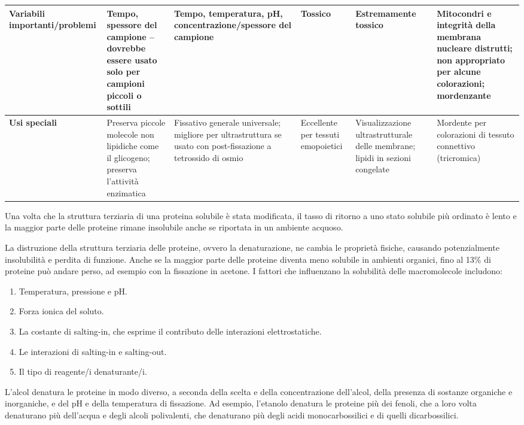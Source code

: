 \begin{landscape}
\begin{longtable}{|p{3.5cm}|p{3cm}|p{3.5cm}|p{3cm}|p{3cm}|p{3.5cm}|}
\textbf{Variabili importanti/problemi} & Tempo, spessore del campione – dovrebbe essere usato solo per campioni piccoli o sottili & Tempo, temperatura, pH, concentrazione/spessore del campione & Tossico & Estremamente tossico & Mitocondri e integrità della membrana nucleare distrutti; non appropriato per alcune colorazioni; mordenzante \\ \hline
\textbf{Usi speciali} & Preserva piccole molecole non lipidiche come il glicogeno; preserva l'attività enzimatica & Fissativo generale universale; migliore per ultrastruttura se usato con post-fissazione a tetrossido di osmio & Eccellente per tessuti emopoietici & Visualizzazione ultrastrutturale delle membrane; lipidi in sezioni congelate & Mordente per colorazioni di tessuto connettivo (tricromica) \\ \hline
\end{longtable}
\end{landscape}

\normalsize
Una volta che la struttura terziaria di una proteina solubile è stata modificata, il tasso di ritorno a uno stato solubile più ordinato è lento e la maggior parte delle proteine rimane insolubile anche se riportata in un ambiente acquoso. 

La distruzione della struttura terziaria delle proteine, ovvero la denaturazione, ne cambia le proprietà fisiche, causando potenzialmente insolubilità e perdita di funzione. Anche se la maggior parte delle proteine diventa meno solubile in ambienti organici, fino al 13\% di proteine può andare perso, ad esempio con la fissazione in acetone. I fattori che influenzano la solubilità delle macromolecole includono:
\begin{enumerate}
    \item Temperatura, pressione e pH.
    \item Forza ionica del soluto.
    \item La costante di salting-in, che esprime il contributo delle interazioni elettrostatiche.
    \item Le interazioni di salting-in e salting-out.
    \item Il tipo di reagente/i denaturante/i.
\end{enumerate}

L'alcol denatura le proteine in modo diverso, a seconda della scelta e della concentrazione dell'alcol, della presenza di sostanze organiche e inorganiche, e del pH e della temperatura di fissazione. Ad esempio, l'etanolo denatura le proteine più dei fenoli, che a loro volta denaturano più dell'acqua e degli alcoli polivalenti, che denaturano più degli acidi monocarbossilici e di quelli dicarbossilici.

